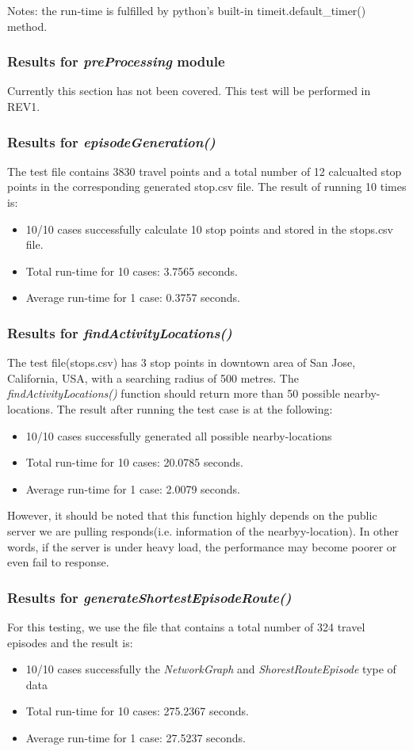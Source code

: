 \documentclass[12pt, titlepage]{article}
\begin{document}
\noindent Notes: the run-time is fulfilled by python's built-in timeit.default\_timer() method.

\subsubsection{Results for \emph{preProcessing} module}
Currently this section has not been covered. This test will be performed in REV1.

\subsubsection{Results for \emph{episodeGeneration()}}
The test file contains 3830 travel points and a total number of 12 calcualted stop points in the corresponding generated stop.csv file. The result of running 10 times is:
\begin{itemize}
    \item 10/10 cases successfully calculate 10 stop points and stored in the stops.csv file.
    \item Total run-time for 10 cases: 3.7565 seconds.
    \item Average run-time for 1 case: 0.3757 seconds.
\end{itemize}

\subsubsection{Results for \emph{findActivityLocations()}}
The test file(stops.csv) has 3 stop points in downtown area of San Jose, California, USA, with a searching radius of 500 metres. The \emph{findActivityLocations()} function should return more than 50 possible nearby-locations. The result after running the test case is at the following:
\begin{itemize}
    \item 10/10 cases successfully generated all possible nearby-locations
    \item Total run-time for 10 cases: 20.0785 seconds.
    \item Average run-time for 1 case: 2.0079 seconds.
\end{itemize}
However, it should be noted that this function highly depends on the public server we are pulling responds(i.e. information of the nearbyy-location). In other words, if the server is under heavy load, the performance may become poorer or even fail to response.

\subsubsection{Results for \emph{generateShortestEpisodeRoute()}}
For this testing, we use the file that contains a total number of 324 travel episodes and the result is:
\begin{itemize}
    \item 10/10 cases successfully the \emph{NetworkGraph} and \emph{ShorestRouteEpisode} type of data
    \item Total run-time for 10 cases: 275.2367 seconds.
    \item Average run-time for 1 case: 27.5237 seconds.
\end{itemize}
\end{document}
